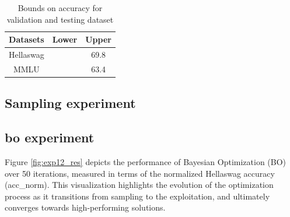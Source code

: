 \begin{table}[h]
    \centering
    \begin{tabular}{|c||c|c|}
    \hline
       Datasets  & Lower & Upper \\
    \hline
       Hellaswag  & & 69.8\\
       MMLU & & 63.4\\
    \hline
    \end{tabular}
    \caption{Bounds on accuracy for validation and testing dataset}
    \label{tab:bounds}
\end{table}

\subsection{Sampling experiment}
\label{sec:sampling}



\subsection{\acrshort{bo} experiment}
\label{sec:bo_exp}
Figure \ref{fig:exp12_res} depicts the performance of Bayesian Optimization (BO) over 50 iterations, measured in terms of the normalized Hellaswag accuracy (acc\_norm). This visualization highlights the evolution of the optimization process as it transitions from sampling to the exploitation, and ultimately converges towards high-performing solutions.



